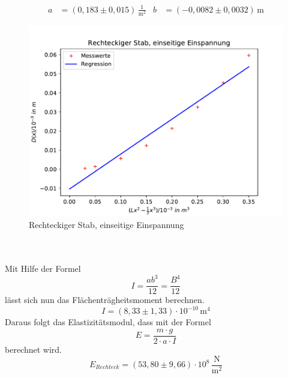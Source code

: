 \begin{align*}
  a &= (0,183 \pm 0,015) \, \mathrm{\frac{1}{m^2}}
  & b &= (-0,0082 \pm 0,0032) \, \mathrm{m}
\end{align*}
\begin{figure}
  \centering
  \includegraphics[width=\textwidth]{plot1.pdf}
  \caption{Rechteckiger Stab, einseitige Einspannung}
  \label{fig:1}
\end{figure}
\\
\\
Mit Hilfe der Formel
\begin{equation*}
  I = \frac{ab^3}{12}= \frac{B^4}{12}
\end{equation*}
lässt sich nun das Flächenträgheitsmoment berechnen.
\begin{equation*}
  I = (8,33 \pm 1,33) \cdot 10^{-10} \, \mathrm{m^4}
\end{equation*}
Daraus folgt das Elastizitätsmodul, dass mit der Formel
\begin{equation}
  E = \frac{m\cdot g}{2\cdot a\cdot I}
  \label{eqn:elasti}
\end{equation}
berechnet wird.
\begin{equation*}
  E_{Rechteck}= (53,80 \pm 9,66)\cdot 10^8 \, \mathrm{\frac{N}{m^2}}
\end{equation*}
\newpage
